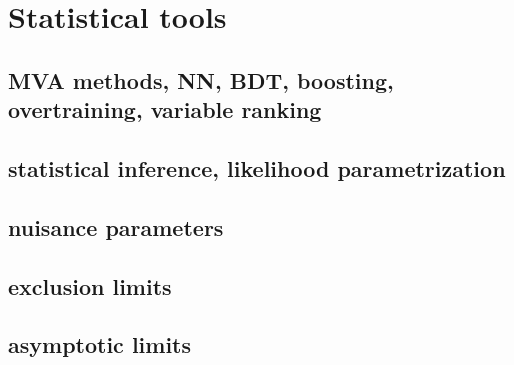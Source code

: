 \chapter{Statistical tools}\label{ch:stat}
\section{ MVA methods, NN, BDT, boosting, overtraining, variable ranking  }
\section{statistical inference, likelihood parametrization}
\section{ nuisance parameters}
\section{exclusion limits }
\section{asymptotic limits }


 









